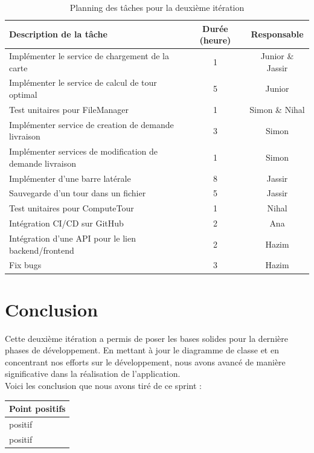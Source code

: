 \documentclass[a4paper]{article}
\begin{document}
\begin{table}[H]
\centering
\begin{tabularx}{\textwidth}{|X|c|c|}
\hline
\textbf{Description de la tâche} & \textbf{Durée (heure)} & \textbf{Responsable} \\ \hline
Implémenter le service de chargement de la carte            & 1                     & Junior \& Jassir                \\ \hline
Implémenter le service de calcul de tour optimal & 5                     & Junior   \\ \hline
Test unitaires pour FileManager            & 1                     & Simon \& Nihal                 \\ \hline
Implémenter service de creation de demande livraison                           & 3                    & Simon                \\ \hline
Implémenter services de modification de demande livraison                          & 1                     & Simon             \\ \hline
Implémenter d'une barre latérale                          & 8                     & Jassir             \\ \hline
Sauvegarde d'un tour dans un fichier                          & 5                     & Jassir             \\ \hline
Test unitaires pour ComputeTour                          & 1                     & Nihal             \\ \hline
Intégration CI/CD sur GitHub                         & 2                     & Ana             \\ \hline
Intégration d'une API pour le lien backend/frontend                         & 2                     & Hazim             \\ \hline
Fix bugs                         & 3                     & Hazim             \\ \hline
\end{tabularx}
\caption{Planning des tâches pour la deuxième itération}
\end{table}

\section*{Conclusion}
Cette deuxième itération a permis de poser les bases solides pour la dernière phases de développement. En mettant à jour le diagramme de classe et en concentrant nos efforts sur le développement, nous avons avancé de manière significative dans la réalisation de l’application. \\
\newline
Voici les conclusion que nous avons tiré de ce sprint :
    \begin{table}[H]
    \centering
    \begin{tabularx}{\textwidth}{|X|}
    \hline
    \textbf{Point positifs} \\ \hline
    positif \\ \hline
    positif \\ \hline
    \end{tabularx}
    \end{table}
\end{document}
